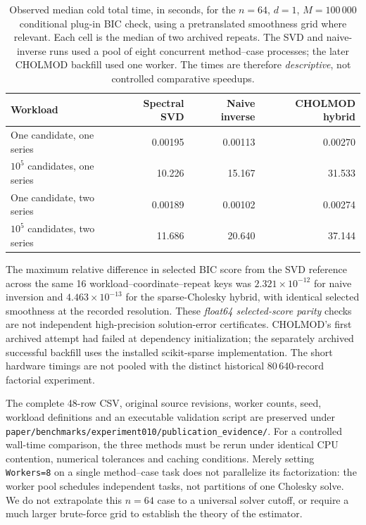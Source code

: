 \begin{table}[tbp]
\centering
\caption{Observed median cold total time, in seconds, for the
$n=64$, $d=1$, $M=100\,000$ conditional plug-in BIC check,
using a pretranslated smoothness grid where relevant.
Each cell is the median of two archived repeats.
The SVD and naive-inverse runs used a pool of eight concurrent
method--case processes; the later CHOLMOD backfill used one
worker. The times are therefore \emph{descriptive},
not controlled comparative speedups.}
\label{tab:experiment010-three-backend}
\begin{tabular}{lrrr}
\toprule
Workload & Spectral SVD & Naive inverse & CHOLMOD hybrid\\
\midrule
One candidate, one series & 0.00195 & 0.00113 & 0.00270\\
$10^5$ candidates, one series & 10.226 & 15.167 & 31.533\\
One candidate, two series & 0.00189 & 0.00102 & 0.00274\\
$10^5$ candidates, two series & 11.686 & 20.640 & 37.144\\
\bottomrule
\end{tabular}
\end{table}

The maximum relative difference in selected BIC score from the
SVD reference across the same 16 workload--coordinate--repeat
keys was $2.321\times10^{-12}$ for naive inversion and
$4.463\times10^{-13}$ for the sparse-Cholesky hybrid, with
identical selected smoothness at the recorded resolution.
These \emph{float64 selected-score parity} checks are not
independent high-precision solution-error certificates.
CHOLMOD's first archived attempt had failed at dependency
initialization; the separately archived successful backfill
uses the installed scikit-sparse implementation. The short
hardware timings are not pooled with the distinct historical
80\,640-record factorial experiment.

The complete 48-row CSV, original source revisions,
worker counts, seed, workload definitions and an executable
validation script are preserved under
\texttt{paper/benchmarks/experiment010/publication\_evidence/}.
For a controlled wall-time comparison, the three methods
must be rerun under identical CPU contention, numerical
tolerances and caching conditions. Merely setting
\texttt{Workers=8} on a single method--case task does not
parallelize its factorization: the worker pool schedules
independent tasks, not partitions of one Cholesky solve.
We do not extrapolate this $n=64$ case to a universal
solver cutoff, or require a much larger brute-force grid
to establish the theory of the estimator.
